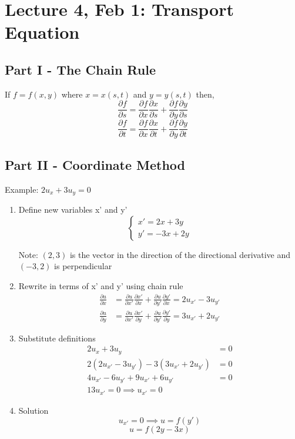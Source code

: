 \documentclass[12pt]{article}
\begin{document}
\section{Lecture 4, Feb 1: Transport Equation}
\subsection*{Part I - The Chain Rule}
If $f=f(x, y)$ where $x = x(s, t)$ and $y= y(s, t)$ then, 
\[\frac{\partial f}{\partial s} = \frac{\partial f}{\partial x} \frac{\partial x}{\partial s} + \frac{\partial f}{\partial y} \frac{\partial y}{\partial s}\]
\[\frac{\partial f}{\partial t} = \frac{\partial f}{\partial x} \frac{\partial x}{\partial t} + \frac{\partial f}{\partial y} \frac{\partial y}{\partial t}\]

\subsection*{Part II - Coordinate Method}
Example: $2u_x + 3u_y = 0$

\begin{enumerate}
    \item Define new variables x' and y'
    \[\begin{cases}
        x' = 2x + 3y\\
        y' = -3x + 2y
    \end{cases}\]

    Note: $(2, 3)$ is the vector in the direction of the directional derivative and $(-3, 2)$ is perpendicular

    \item Rewrite in terms of x' and y' using chain rule 
    \begin{align*}
        \frac{\partial u}{\partial x} &= \frac{\partial u}{\partial x'} \frac{\partial x'}{\partial x} + \frac{\partial u}{\partial y'} \frac{\partial y'}{\partial x} = 2u_{x'} - 3u_{y'}\\
        \frac{\partial u}{\partial y} &= \frac{\partial u}{\partial x'} \frac{\partial x'}{\partial y} + \frac{\partial u}{\partial y'} \frac{\partial y'}{\partial y} = 3u_{x'}  + 2u_{y'}
    \end{align*}
    
    \item Substitute definitions
    \begin{align*}
        2u_x + 3u_y &= 0\\
        2(2u_{x'} - 3u_{y'}) - 3(3u_{x'} + 2u_{y'}) &= 0\\
        4u_{x'} - 6u_{y'} + 9u_{x'} + 6u_{y'} &= 0\\
        13u_{x'} = 0 \implies u_{x'} = 0
    \end{align*}

    \item Solution 
    \[u_{x'} = 0 \implies u = f(y')\]
    \[\boxed{u = f(2y-3x)}\]
\end{enumerate}
\end{document}
